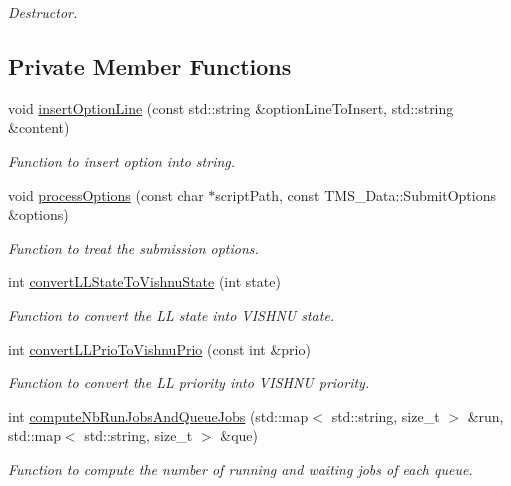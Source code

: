 \begin{DoxyCompactItemize}
\begin{DoxyCompactList}\small\item\em Destructor. \item\end{DoxyCompactList}\end{DoxyCompactItemize}
\subsection*{Private Member Functions}
\begin{DoxyCompactItemize}
\item 
void \hyperlink{classLLServer_a12ec697d6b846611c1e67ac1057d4ee0}{insertOptionLine} (const std::string \&optionLineToInsert, std::string \&content)
\begin{DoxyCompactList}\small\item\em Function to insert option into string. \item\end{DoxyCompactList}\item 
void \hyperlink{classLLServer_a54487bfb5d744a3b892e22127f3643ea}{processOptions} (const char $\ast$scriptPath, const TMS\_\-Data::SubmitOptions \&options)
\begin{DoxyCompactList}\small\item\em Function to treat the submission options. \item\end{DoxyCompactList}\item 
int \hyperlink{classLLServer_a0691e56eda4540ad4379a60ce1e5f3f5}{convertLLStateToVishnuState} (int state)
\begin{DoxyCompactList}\small\item\em Function to convert the LL state into VISHNU state. \item\end{DoxyCompactList}\item 
int \hyperlink{classLLServer_a8649f7c42ad24f66215a63d12e2d54a6}{convertLLPrioToVishnuPrio} (const int \&prio)
\begin{DoxyCompactList}\small\item\em Function to convert the LL priority into VISHNU priority. \item\end{DoxyCompactList}\item 
int \hyperlink{classLLServer_a3a9587a14a7cfb5e308b0f8173649cf9}{computeNbRunJobsAndQueueJobs} (std::map$<$ std::string, size\_\-t $>$ \&run, std::map$<$ std::string, size\_\-t $>$ \&que)
\begin{DoxyCompactList}\small\item\em Function to compute the number of running and waiting jobs of each queue. \item\end{DoxyCompactList}\item 

\end{DoxyCompactItemize}
